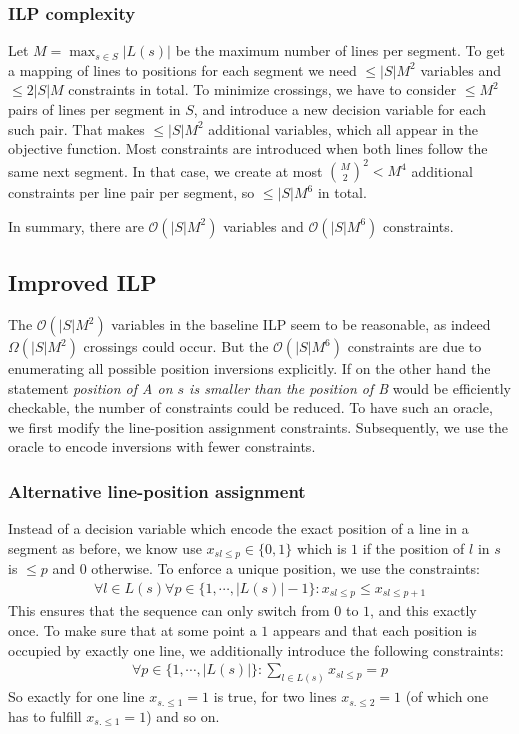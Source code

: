 \documentclass{llncs}
\begin{document}
\subsubsection{ILP complexity}
Let $M = \max_{s \in S} |L(s)|$ be the maximum number of lines per segment. To get a mapping of lines to positions for each segment we need $\leq |S|M^{2}$ variables and $\leq 2|S|M$ constraints in total. To minimize crossings, we have to consider $\leq M^{2}$ pairs of lines per segment in $S$, and introduce a new decision variable for each such pair. That makes $\leq |S| M^{2}$ additional variables, which all appear in the objective function. Most constraints are introduced when both lines follow the same next segment. In that case, we create at most $\binom{M}{2}^{2} < M^{4}$ additional constraints per line pair per segment, so $\leq |S| M^{6}$ in total. 

In summary, there are $\mathcal{O}(|S|M^{2})$ variables and $\mathcal{O}(|S|M^{6})$ constraints.

%
\subsection{Improved ILP}\label{SEC:improved}
%
The $\mathcal{O}(|S|M^{2})$ variables in the baseline ILP seem to be reasonable, as indeed $\Omega(|S|M^{2})$ crossings could occur. But the $\mathcal{O}(|S|M^{6})$ constraints are due to enumerating all possible position inversions explicitly. If on the other hand the statement \emph{position of A on $s$ is smaller than the position of B} would be efficiently checkable, the number of constraints could be reduced. To have such an oracle, we first modify the line-position assignment constraints. Subsequently, we use  the oracle to encode inversions with fewer constraints.

\subsubsection{Alternative line-position assignment}
Instead of a decision variable which encode the exact position of a line in a segment as before, we know use $x_{sl\leq p} \in \{0,1\}$ which is $1$ if the position of $l$ in $s$ is $\leq p$ and $0$ otherwise. To enforce a unique position, we use the constraints:
\begin{align}
	\forall l \in L(s) \forall p \in \{1, \cdots, |L(s)|-1\}: x_{sl\leq p} \leq x_{sl\leq p+1} \label{EQ:up_constr}
\end{align}
This ensures that the sequence can only switch from $0$ to $1$, and this exactly once. To make sure that at some point a $1$ appears and that each position is occupied by exactly one line, we additionally introduce the following constraints:
\begin{align}
	\forall p \in \{1, \cdots, |L(s)|\}: \sum_{l \in L(s)} x_{sl\leq p} = p \label{EQ:01_constr}
\end{align}
So exactly for  one line $x_{s.\leq 1} =1$ is true, for two lines $x_{s.\leq 2} = 1$ (of which one has to fulfill $x_{s.\leq 1} =1$) and so on.
\end{document}

